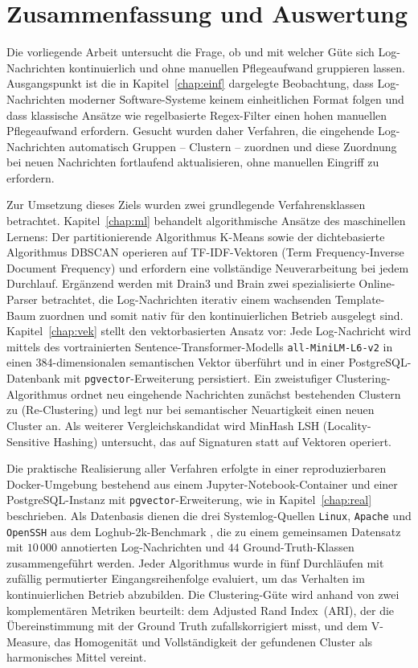\chapter{Zusammenfassung und Auswertung}

Die vorliegende Arbeit untersucht die Frage, ob und mit welcher Güte sich Log-Nachrichten kontinuierlich und ohne manuellen Pflegeaufwand gruppieren lassen. Ausgangspunkt ist die in Kapitel~\ref{chap:einf} dargelegte Beobachtung, dass Log-Nachrichten moderner Software-Systeme keinem einheitlichen Format folgen und dass klassische Ansätze wie regelbasierte Regex-Filter einen hohen manuellen Pflegeaufwand erfordern. Gesucht wurden daher Verfahren, die eingehende Log-Nachrichten automatisch Gruppen -- Clustern -- zuordnen und diese Zuordnung bei neuen Nachrichten fortlaufend aktualisieren, ohne manuellen Eingriff zu erfordern.

Zur Umsetzung dieses Ziels wurden zwei grundlegende Verfahrensklassen betrachtet. Kapitel~\ref{chap:ml} behandelt algorithmische Ansätze des maschinellen Lernens: Der partitionierende Algorithmus K-Means sowie der dichtebasierte Algorithmus DBSCAN operieren auf TF-IDF-Vektoren (Term Frequency-Inverse Document Frequency) und erfordern eine vollständige Neuverarbeitung bei jedem Durchlauf. Ergänzend werden mit Drain3 und Brain zwei spezialisierte Online-Parser betrachtet, die Log-Nachrichten iterativ einem wachsenden Template-Baum zuordnen und somit nativ für den kontinuierlichen Betrieb ausgelegt sind. Kapitel~\ref{chap:vek} stellt den vektorbasierten Ansatz vor: Jede Log-Nachricht wird mittels des vortrainierten Sentence-Transformer-Modells \texttt{all-MiniLM-L6-v2} in einen 384-dimensionalen semantischen Vektor überführt und in einer PostgreSQL-Datenbank mit \texttt{pgvector}-Erweiterung persistiert. Ein zweistufiger Clustering-Algorithmus ordnet neu eingehende Nachrichten zunächst bestehenden Clustern zu (Re-Clustering) und legt nur bei semantischer Neuartigkeit einen neuen Cluster an. Als weiterer Vergleichskandidat wird MinHash LSH (Locality-Sensitive Hashing) untersucht, das auf Signaturen statt auf Vektoren operiert.

Die praktische Realisierung aller Verfahren erfolgte in einer reproduzierbaren Docker-Umgebung bestehend aus einem Jupyter-Notebook-Container und einer PostgreSQL-Instanz mit \texttt{pgvector}-Erweiterung, wie in Kapitel~\ref{chap:real} beschrieben. Als Datenbasis dienen die drei Systemlog-Quellen \texttt{Linux}, \texttt{Apache} und \texttt{OpenSSH} aus dem Loghub-2k-Benchmark \cite{zhu2023loghublargecollectionlog}, die zu einem gemeinsamen Datensatz mit $10\,000$ annotierten Log-Nachrichten und $44$ Ground-Truth-Klassen zusammengeführt werden. Jeder Algorithmus wurde in fünf Durchläufen mit zufällig permutierter Eingangsreihenfolge evaluiert, um das Verhalten im kontinuierlichen Betrieb abzubilden. Die Clustering-Güte wird anhand von zwei komplementären Metriken beurteilt: dem Adjusted Rand Index~(ARI), der die Übereinstimmung mit der Ground Truth zufallskorrigiert misst, und dem V-Measure, das Homogenität und Vollständigkeit der gefundenen Cluster als harmonisches Mittel vereint.

